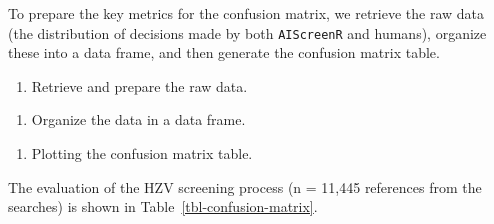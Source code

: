 \documentclass[
  letterpaper,
  DIV=11,
  numbers=noendperiod]{scrartcl}
\providecommand{\tightlist}{%
  \setlength{\itemsep}{0pt}\setlength{\parskip}{0pt}}
\begin{document}
To prepare the key metrics for the confusion matrix, we retrieve the raw
data (the distribution of decisions made by both \texttt{AIScreenR} and
humans), organize these into a data frame, and then generate the
confusion matrix table.

\begin{enumerate}
\def\labelenumi{\arabic{enumi}.}
\tightlist
\item
  Retrieve and prepare the raw data.
\end{enumerate}

\begin{enumerate}
\def\labelenumi{\arabic{enumi}.}
\setcounter{enumi}{1}
\tightlist
\item
  Organize the data in a data frame.
\end{enumerate}

\begin{enumerate}
\def\labelenumi{\arabic{enumi}.}
\setcounter{enumi}{2}
\tightlist
\item
  Plotting the confusion matrix table.
\end{enumerate}

The evaluation of the HZV screening process (n = 11,445 references from
the searches) is shown in Table~\ref{tbl-confusion-matrix}.

\begin{table}

\caption{\label{tbl-confusion-matrix}Confusion matrix AIScreenR vs HZV
team}


\end{table}%
\end{document}
